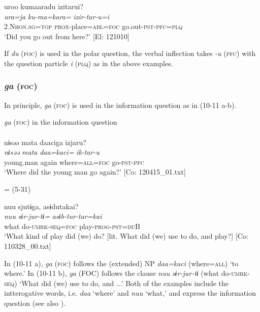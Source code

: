   \ex  %
      \glll    uroo  kumaaradu  izitarui?\\
      \textit{ura=ja}  \textit{ku-ma=kara=}  \textit{izir-tar-u=i}\\
      2.N\textsc{hon}.\textsc{sg}=\textsc{top}  \textsc{prox}-place=\textsc{abl}=\textsc{foc}  go.out-\textsc{pst}-\textsc{pfc}=\textsc{plq}\\
      \glt       ‘Did you go out from here?’ [El: 121010]
\z
\z

If \textit{du} (\textsc{foc}) is used in the polar question, the verbal inflection takes \textit{{}-u} (\textsc{pfc}) with the question particle \textit{i} (\textsc{plq}) as in the above examples.

\subsubsection{\textit{ga} (\textsc{foc})}\label{sec:10.1.2.2}

In principle, \textit{ga} (\textsc{foc}) is used in the information question as in (10-11 a-b).

\ea\label{ex:10.11}   \textit{ga} (\textsc{foc}) in the information question\\
  \ea\relax [= (5-34 a)]\\
      \glll    nɨsəə  mata  daaciga  izjaru?\\
      \textit{nɨsəə}  \textit{mata}  \textit{daa=kaci=}  \textit{ik-tar-u}\\
      young.man  again  where=\textsc{all}=\textsc{foc}  go-\textsc{pst}-\textsc{pfc}\\
      \glt       ‘Where did the young man go again?’ [Co: 120415\_01.txt]

  \ex{} = (5-31)

      \glll    nuu  sjutɨga,  asɨdutakai?\\
      \textit{nuu}  \textit{sɨr-jur-tɨ=}  \textit{asɨb-tur-tar=kai}\\
      what  do-\textsc{umrk}-\textsc{seq}=\textsc{foc}  play-\textsc{prog}-\textsc{pst}=\textsc{du}B\\
      \glt       ‘What kind of play did (we) do? [lit. What did (we) use to do, and play?] [Co: 110328\_00.txt]
    \z
\z

In (10-11 a), \textit{ga} (\textsc{foc}) follows the (extended) NP \textit{daa=kaci} (where=\textsc{all}) ‘to where.’ In (10-11 b), \textit{ga} (FOC) follows the clause \textit{nuu} \textit{sɨr-jur-tɨ} (what do-\textsc{umrk}-\textsc{seq}) ‘What did (we) use to do, and ...’ Both of the examples include the intterogative words, i.e. \textit{daa} ‘where’ and \textit{nuu} ‘what,’ and express the information question (see also ).

